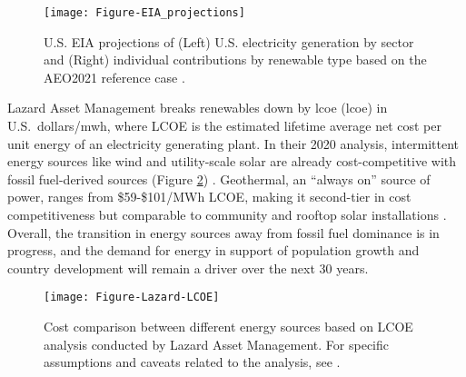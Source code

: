 \begin{figure}[htp]
\centering
\texttt{[image: Figure-EIA\_projections]}
\caption[U.S. EIA projections based on the AEO2021 reference case]{U.S. EIA projections of (Left) U.S. electricity generation by sector and (Right) individual contributions by renewable type based on the AEO2021 reference case \protect\citep{us_energy_information_administration_annual_2021}.}
\label{fig:eia_2021_projections}
\end{figure}

Lazard Asset Management breaks renewables down by \acrlong{lcoe} (\acrshort{lcoe}) in U.S.\ dollars/\acrshort{mwh}, where LCOE is the estimated lifetime average net cost per unit energy of an electricity generating plant. In their 2020 analysis, intermittent energy sources like wind and utility-scale solar are already cost-competitive with fossil fuel-derived sources (Figure \ref{fig:lazard_lcoe}) \citep{lazard_lazards_2020}. Geothermal, an “always on” source of power, ranges from \$59-\$101/MWh LCOE, making it second-tier in cost competitiveness but comparable to community and rooftop solar installations \citep{lazard_lazards_2020}. Overall, the transition in energy sources away from fossil fuel dominance is in progress, and the demand for energy in support of population growth and country development will remain a driver over the next 30 years.
 
\begin{figure}[htp]
\centering
\texttt{[image: Figure-Lazard-LCOE]}
\caption[Lazard Levelized Cost of Energy 2020 projections]{Cost comparison between different energy sources based on LCOE analysis conducted by Lazard Asset Management. For specific assumptions and caveats related to the analysis, see \protect\citet{lazard_lazards_2020}.}
\label{fig:lazard_lcoe}
\end{figure}

